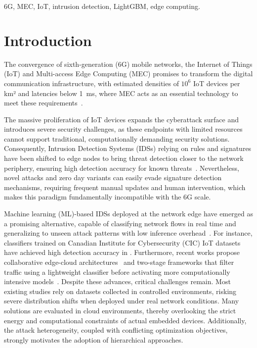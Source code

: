 \documentclass[conference]{IEEEtran}
\begin{document}
\begin{IEEEkeywords}
6G, MEC, IoT, intrusion detection, LightGBM, edge computing.
\end{IEEEkeywords}

\section{Introduction}

The convergence of sixth-generation (6G) mobile networks, the Internet of Things (IoT) and Multi-access Edge Computing (MEC) promises to transform the digital communication infrastructure, with estimated densities of $10^6$ IoT devices per km² and latencies below 1~ms, where MEC acts as an essential technology to meet these requirements~\cite{you:21}.

The massive proliferation of IoT devices expands the cyberattack surface and introduces severe security challenges, as these endpoints with limited resources cannot support traditional, computationally demanding security solutions. Consequently, Intrusion Detection Systems (IDSs) relying on rules and signatures have been shifted to edge nodes to bring threat detection closer to the network periphery, ensuring high detection accuracy for known threats~\cite{lazarevic:05}. Nevertheless, novel attacks and zero day variants can easily evade signature detection mechanisms, requiring frequent manual updates and human intervention, which makes this paradigm fundamentally incompatible with the 6G scale.

Machine learning (ML)-based IDSs deployed at the network edge have emerged as a promising alternative, capable of classifying network flows in real time and generalizing to unseen attack patterns with low inference overhead~\cite{gyamfi:22}. For instance, classifiers trained on Canadian Institute for Cybersecurity (CIC) IoT datasets have achieved high detection accuracy in \cite{houichi:25,chen:24}. Furthermore, recent works propose collaborative edge-cloud architectures~\cite{yang:23} and two-stage frameworks that filter traffic using a lightweight classifier before activating more computationally intensive models~\cite{aldaej:24}. Despite these advances, critical challenges remain. Most existing studies rely on datasets collected in controlled environments, risking severe distribution shifts when deployed under real network conditions. Many solutions are evaluated in cloud environments, thereby overlooking the strict energy and computational constraints of actual embedded devices. Additionally, the attack heterogeneity, coupled with conflicting optimization objectives, strongly motivates the adoption of hierarchical approaches.
\end{document}
